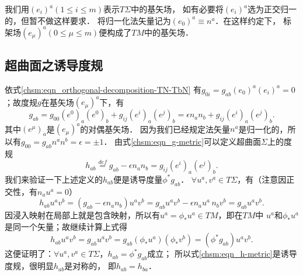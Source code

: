 

我们用$(e_i)^a (1\leqslant i \leqslant m)$表示$T\Sigma$中的基矢场，
如有必要将$(e_i)^a$选为正交归一的，但暂不做这样要求．
将归一化法矢量记为$(e_0)^a\equiv {n}^a$．在这样约定下，
标架场$(e_\mu)^a (0\leqslant \mu \leqslant m)$便构成了$TM$中的基矢场．




\subsection{超曲面之诱导度规}
依式\eqref{chsm:eqn_orthogonal-decomposition-TN-TbN}
有$g_{0i}={g}_{ab}(e_0)^a (e_i)^a=0$；故度规$g$在基矢场$(e_\mu)^a$下，有
\begin{equation}\label{chsm:eqn_g-metric}
    g_{ab}= g_{00} (e^0)_a(e^0)_b + g_{ij} (e^i)_a(e^j)_b
    = \epsilon n_a n_b + g_{ij} (e^i)_a(e^j)_b.
\end{equation}
其中$(e^\mu)_a$是$(e_\mu)^a$的对偶基矢场．
因为我们已经规定法矢量${n}^a$是归一化的，所以有$g_{00}={g}_{ab}{n}^a {n}^b=\epsilon=\pm 1$．
由式\eqref{chsm:eqn_g-metric}可以定义超曲面$\Sigma$上的度规
\begin{equation}\label{chsm:eqn_h-metric}
    h_{ab} \overset{def}{=} g_{ab}- \epsilon {n}_a {n}_b = g_{ij} (e^i)_a(e^j)_b.
\end{equation}
我们来验证一下上述定义的$h_{ab}$便是诱导度量$\phi^* g_{ab}$．
$\forall u^a, v^a \in T\Sigma$，有（注意因正交性，有${n}_au^a=0$）
\begin{equation}
    h_{ab}u^a v^b = (g_{ab}-\epsilon{n}_a {n}_b)u^a v^b
      =  g_{ab}u^a v^b -\epsilon {n}_au^a \, {n}_b v^b = g_{ab}u^a v^b .
\end{equation}
因浸入映射在局部上就是包含映射，所以有$u^a=\phi_{*}u^a\in TM$，即在$TM$中
$u^a$和$\phi_{*}u^a$是同一个矢量；故继续计算上式得
\begin{equation}
    h_{ab}u^a v^b =g_{ab}u^a v^b = g_{ab}(\phi_{*}u^a) (\phi_{*}v^b)=(\phi^{*}g_{ab})u^a v^b.
\end{equation}
这便证明了：$\forall u^a, v^a \in T\Sigma$，$h_{ab}=\phi^* g_{ab}$成立；
所以式\eqref{chsm:eqn_h-metric}是诱导度规，很明显$h_{ab}$是对称的，
即$h_{ab}=h_{ba}$．

